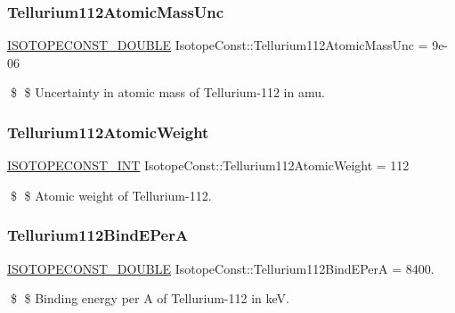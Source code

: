 \subsubsection{\texorpdfstring{Tellurium112\+Atomic\+Mass\+Unc}{Tellurium112AtomicMassUnc}}
{\footnotesize\ttfamily \mbox{\hyperlink{group___isotope_const-_macros_ga8f45a7272ce02c0b4c65c44636ed719a}{I\+S\+O\+T\+O\+P\+E\+C\+O\+N\+S\+T\+\_\+\+D\+O\+U\+B\+LE}} Isotope\+Const\+::\+Tellurium112\+Atomic\+Mass\+Unc = 9e-\/06}

\$ \$ Uncertainty in atomic mass of Tellurium-\/112 in amu. \mbox{\label{group___isotope_const-_tellurium-_te112_ga9754ac99ec1bf8d249b51c4253e75b13}} 
\subsubsection{\texorpdfstring{Tellurium112\+Atomic\+Weight}{Tellurium112AtomicWeight}}
{\footnotesize\ttfamily \mbox{\hyperlink{group___isotope_const-_macros_ga5f18360b3e99483a35c32d789e62621c}{I\+S\+O\+T\+O\+P\+E\+C\+O\+N\+S\+T\+\_\+\+I\+NT}} Isotope\+Const\+::\+Tellurium112\+Atomic\+Weight = 112}

\$ \$ Atomic weight of Tellurium-\/112. \mbox{\label{group___isotope_const-_tellurium-_te112_ga2568fbcfd4074094cc4ea878783e252d}} 
\subsubsection{\texorpdfstring{Tellurium112\+Bind\+E\+PerA}{Tellurium112BindEPerA}}
{\footnotesize\ttfamily \mbox{\hyperlink{group___isotope_const-_macros_ga8f45a7272ce02c0b4c65c44636ed719a}{I\+S\+O\+T\+O\+P\+E\+C\+O\+N\+S\+T\+\_\+\+D\+O\+U\+B\+LE}} Isotope\+Const\+::\+Tellurium112\+Bind\+E\+PerA = 8400.}

\$ \$ Binding energy per A of Tellurium-\/112 in keV. \mbox{\label{group___isotope_const-_tellurium-_te112_ga1236a830a540a95d600f265eba747b31}} 

